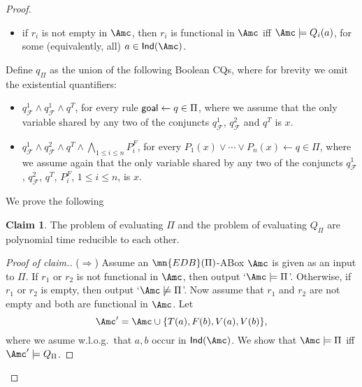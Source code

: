 \documentclass{lmcs}
\theoremstyle{definition}
\newtheorem*{claim*}{Claim}
\let\OriginalQedSymbol\qedsymbol
\renewcommand{\qedsymbol}{\OriginalQedSymbol\setcounter{claim}{0}}
\let\NormalQedSymbol\qedsymbol
\newenvironment{clmproof}[1]{\renewcommand{\qedsymbol}{$\dashv$}\begin{proof}[Proof of claim.]\space#1}{\end{proof}\renewcommand{\qedsymbol}{\NormalQedSymbol}}
\begin{document}
\begin{proof}
\begin{itemize}
\item if $r_{i}$ is not empty in $\Amc$, then $r_{i}$ is functional in $\Amc$ iff 
$\Amc\models Q_{i}(a)$, for some (equivalently, all) $a\in {\sf Ind}(\Amc)$.
\end{itemize}
Define $q_{\Pi}$ as the union of the following Boolean CQs, where for brevity we omit the existential quantifiers:
\begin{itemize}
\item $q_{\mathcal{F}}^{1}\wedge q_{\mathcal{F}}^{1} \wedge q^{T}$, for every rule 
${\sf goal}\leftarrow q\in \Pi$, where we assume that the only variable shared by
any two of the conjuncts $q_{\mathcal{F}}^{1}$, $q_{\mathcal{F}}^{2}$ and $q^{T}$ is $x$.
\item $q_{\mathcal{F}}^{1} \wedge q_{\mathcal{F}}^{2} \wedge q^{T} \wedge \bigwedge_{1\leq i \leq n}P_{i}^{F}$, 
for every $P_{1}(x)\vee \cdots \vee P_{n}(x) \leftarrow q \in \Pi$,
where we assume again that the only variable shared by any two of the conjuncts $q_{\mathcal{F}}^{1}$, 
$q_{\mathcal{F}}^{2}$, $q^{T}$, $P_{i}^{F}$, $1\leq i \leq n$, is $x$.
\end{itemize}
We prove the following

\begin{claim*}
The problem of evaluating $\Pi$ and the problem of evaluating $Q_{\Pi}$ are polynomial time reducible to each other.
\end{claim*}
\begin{clmproof}
($\Rightarrow$) Assume an $\mn{EDB}(\Pi)$-ABox $\Amc$ is given
as an input to $\Pi$. If $r_{1}$ or $r_{2}$ is not functional in $\Amc$, then output
`$\Amc\models \Pi$'. Otherwise, if $r_{1}$ or $r_{2}$ is empty, then output `$\Amc\not\models\Pi$'. 
Now assume that $r_{1}$ and $r_{2}$ are not empty and both are functional in $\Amc$.
Let
$$
\Amc'=\Amc \cup \{T(a),F(b),V(a),V(b)\},
$$
where we asume w.l.o.g.~that $a,b$ occur in ${\sf Ind}(\Amc)$.  We show that
$\Amc \models \Pi$ iff $\Amc'\models Q_{\Pi}$.


\end{clmproof}
\end{proof}
\end{document}
